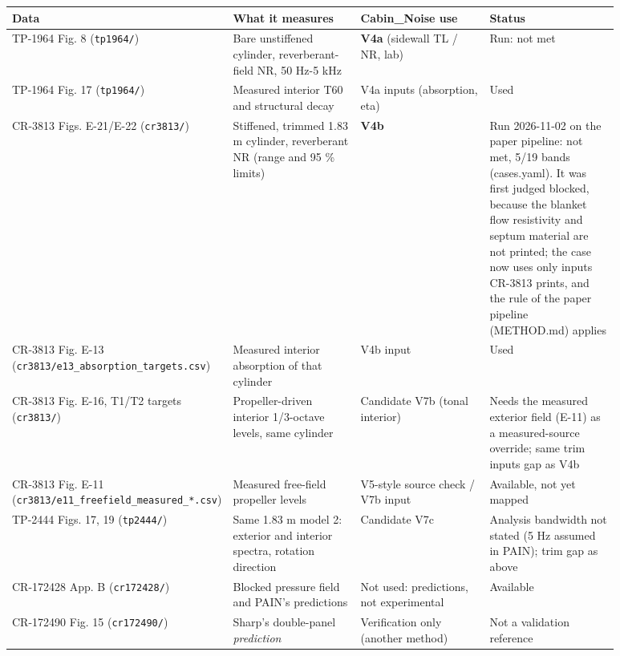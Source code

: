 \documentclass[10pt,a4paper]{article}
\begin{document}
{\small
\begin{longtable}{>{\raggedright\arraybackslash}p{0.220\linewidth}>{\raggedright\arraybackslash}p{0.220\linewidth}>{\raggedright\arraybackslash}p{0.220\linewidth}>{\raggedright\arraybackslash}p{0.220\linewidth}}
\hline
\textbf{Data} & \textbf{What it measures} & \textbf{Cabin\_Noise use} & \textbf{Status} \\
\hline
\endhead
TP-1964 Fig. 8 (\texttt{tp1964/\allowbreak{}}) & Bare unstiffened cylinder, reverberant-field NR, 50 Hz-5 kHz & \textbf{V4a} (sidewall TL / NR, lab) & Run: not met \\
TP-1964 Fig. 17 (\texttt{tp1964/\allowbreak{}}) & Measured interior T60 and structural decay & V4a inputs (absorption, eta) & Used \\
CR-3813 Figs. E-21/E-22 (\texttt{cr3813/\allowbreak{}}) & Stiffened, trimmed 1.83 m cylinder, reverberant NR (range and 95 \% limits) & \textbf{V4b} & Run 2026-11-02 on the paper pipeline: not met, 5/19 bands (cases.yaml). It was first judged blocked, because the blanket flow resistivity and septum material are not printed; the case now uses only inputs CR-3813 prints, and the rule of the paper pipeline (METHOD.md) applies \\
CR-3813 Fig. E-13 (\texttt{cr3813/\allowbreak{}e13\_\allowbreak{}absorption\_\allowbreak{}targets.\allowbreak{}csv}) & Measured interior absorption of that cylinder & V4b input & Used \\
CR-3813 Fig. E-16, T1/T2 targets (\texttt{cr3813/\allowbreak{}}) & Propeller-driven interior 1/3-octave levels, same cylinder & Candidate V7b (tonal interior) & Needs the measured exterior field (E-11) as a measured-source override; same trim inputs gap as V4b \\
CR-3813 Fig. E-11 (\texttt{cr3813/\allowbreak{}e11\_\allowbreak{}freefield\_\allowbreak{}measured\_\allowbreak{}*.\allowbreak{}csv}) & Measured free-field propeller levels & V5-style source check / V7b input & Available, not yet mapped \\
TP-2444 Figs. 17, 19 (\texttt{tp2444/\allowbreak{}}) & Same 1.83 m model 2: exterior and interior spectra, rotation direction & Candidate V7c & Analysis bandwidth not stated (5 Hz assumed in PAIN); trim gap as above \\
CR-172428 App. B (\texttt{cr172428/\allowbreak{}}) & Blocked pressure field and PAIN's predictions & Not used: predictions, not experimental & Available \\
CR-172490 Fig. 15 (\texttt{cr172490/\allowbreak{}}) & Sharp's double-panel \emph{prediction} & Verification only (another method) & Not a validation reference \\

\end{longtable}}
\end{document}
